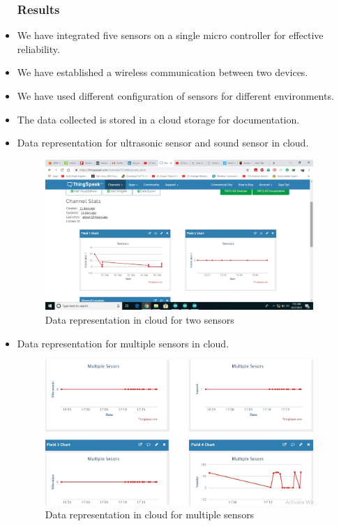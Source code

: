 \documentclass{beamer}
\begin{document}
\begin{frame}
\begin{itemize}\frametitle{Results}
\item We have integrated five sensors on a single micro controller for effective reliability. 
\item We have established a wireless communication between two devices.
\item We have used different configuration of sensors for different environments.
\item The data collected is stored in a cloud storage for documentation.
\end{itemize} 
\end{frame}
\begin{frame}
\begin{itemize}
\item Data representation for ultrasonic sensor and sound sensor in cloud.
  \begin{figure}[H]
  \centerline{\includegraphics[width=4.0in]{two.JPG}}
  \caption{ \textbf{}Data representation in cloud for two sensors}
  \end{figure}
\end{itemize}
\end{frame}
\begin{frame}
\begin{itemize}
\item Data representation for multiple sensors in cloud.
  \begin{figure}
  \centerline{\includegraphics[width=4.0in]{multiplesensor.JPG}}
  \caption{ \textbf{}Data representation in cloud for multiple sensors}
  \end{figure}
\end{itemize}
\end{frame}
\end{document}
